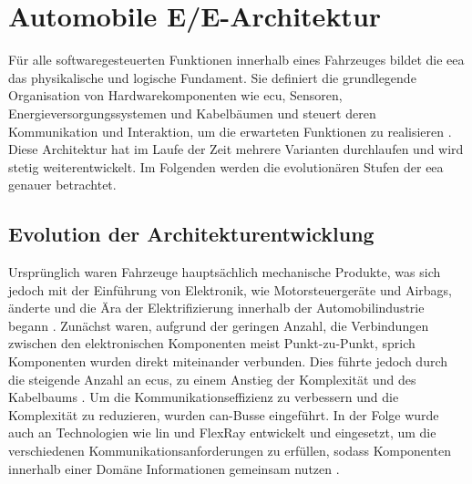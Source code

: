 \section{Automobile E/E-Architektur}
\label{sect:eearchitecture}

Für alle softwaregesteuerten Funktionen innerhalb eines Fahrzeuges bildet die \gls{eea} das physikalische und logische Fundament. Sie definiert die grundlegende Organisation von Hardwarekomponenten wie \gls{ecu}, Sensoren, Energieversorgungssystemen und Kabelbäumen und steuert deren Kommunikation und Interaktion, um die erwarteten Funktionen zu realisieren \cite{jiang2019vehicle}. Diese Architektur hat im Laufe der Zeit mehrere Varianten durchlaufen und wird stetig weiterentwickelt. Im Folgenden werden die evolutionären Stufen der \gls{eea} genauer betrachtet.

\subsection*{Evolution der Architekturentwicklung}

Ursprünglich waren Fahrzeuge hauptsächlich mechanische Produkte, was sich jedoch mit der Einführung von Elektronik, wie Motorsteuergeräte und Airbags, änderte und die Ära der Elektrifizierung innerhalb der Automobilindustrie begann \cite{jiang2019vehicle}\cite{zhuRequirementsDrivenAutomotiveElectrical2021}. Zunächst waren, aufgrund der geringen Anzahl, die Verbindungen zwischen den elektronischen Komponenten meist Punkt-zu-Punkt, sprich Komponenten wurden direkt miteinander verbunden. Dies führte jedoch durch die steigende Anzahl an \glspl{ecu}, zu einem Anstieg der Komplexität und des Kabelbaums \cite{wang2024review}. Um die Kommunikationseffizienz zu verbessern und die Komplexität zu reduzieren, wurden \gls{can}-Busse eingeführt. In der Folge wurde auch an Technologien wie \gls{lin} und FlexRay entwickelt und eingesetzt, um die verschiedenen Kommunikationsanforderungen zu erfüllen, sodass Komponenten innerhalb einer Domäne Informationen gemeinsam nutzen \cite{wang2024review}\cite{zhuRequirementsDrivenAutomotiveElectrical2021}.

